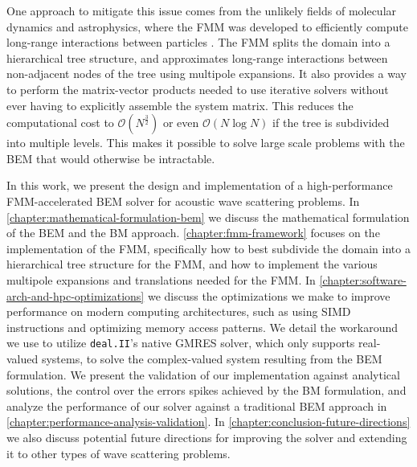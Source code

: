 One approach to mitigate this issue comes from the unlikely fields of molecular dynamics and astrophysics, where the \ac{FMM} was developed to efficiently compute long-range interactions between particles \cite{greengardfastalgorithmparticle1987,barneshierarchicallogforcecalculation1986}. The \ac{FMM} splits the domain into a hierarchical tree structure, and approximates long-range interactions between non-adjacent nodes of the tree using multipole expansions. It also provides a way to perform the matrix-vector products needed to use iterative solvers without ever having to explicitly assemble the system matrix. This reduces the computational cost to $\mathcal{O}(N^{\frac{3}{2}})$ or even $\mathcal{O}(N \log N)$ if the tree is subdivided into multiple levels\cite{darvefastmultipolemethod2000,chengwidebandfastmultipole2006}. This makes it possible to solve large scale problems with the \ac{BEM} that would otherwise be intractable.

In this work, we present the design and implementation of a high-performance \ac{FMM}-accelerated \ac{BEM} solver for acoustic wave scattering problems.
In \autoref{chapter:mathematical-formulation-bem} we discuss the mathematical formulation of the \ac{BEM} and the \ac{BM} approach. \autoref{chapter:fmm-framework} focuses on the implementation of the \ac{FMM}, specifically how to best subdivide the domain into a hierarchical tree structure for the \ac{FMM}, and how to implement the various multipole expansions and translations needed for the \ac{FMM}. In \autoref{chapter:software-arch-and-hpc-optimizations} we discuss the optimizations we make to improve performance on modern computing architectures, such as using SIMD instructions and optimizing memory access patterns. We detail the workaround we use to utilize \texttt{deal.II}'s native \ac{GMRES} solver, which only supports real-valued systems, to solve the complex-valued system resulting from the \ac{BEM} formulation. We present the validation of our implementation against analytical solutions, the control over the errors spikes achieved by the \ac{BM} formulation, and analyze the performance of our solver against a traditional \ac{BEM} approach in \autoref{chapter:performance-analysis-validation}.
In \autoref{chapter:conclusion-future-directions} we also discuss potential future directions for improving the solver and extending it to other types of wave scattering problems.